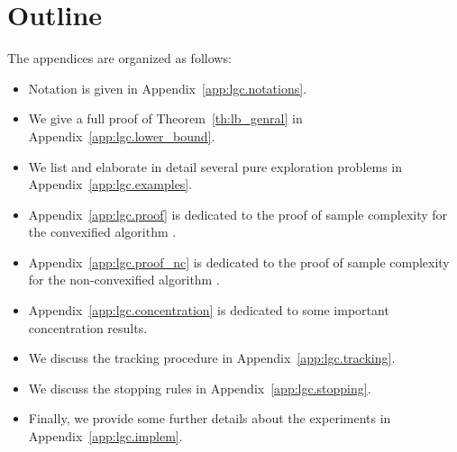 \section{Outline}\label{app:lgc.outline}

The appendices are organized as follows:
\begin{itemize}[label=$\square$]
    \item Notation is given in Appendix~\ref{app:lgc.notations}. 
    \item We give a full proof of Theorem~\ref{th:lb_genral} in Appendix~\ref{app:lgc.lower_bound}.
    \item We list and elaborate in detail several pure exploration problems in Appendix~\ref{app:lgc.examples}.
    \item Appendix~\ref{app:lgc.proof} is dedicated to the proof of sample complexity for the convexified algorithm \LGC.
    \item Appendix~\ref{app:lgc.proof_nc} is dedicated to the proof of sample complexity for the non-convexified algorithm \LG.
    \item Appendix~\ref{app:lgc.concentration} is dedicated to some important concentration results.
    \item We discuss the tracking procedure in Appendix~\ref{app:lgc.tracking}.
    \item We discuss the stopping rules in Appendix~\ref{app:lgc.stopping}.
    \item Finally, we provide some further details about the experiments in Appendix~\ref{app:lgc.implem}.
\end{itemize}
